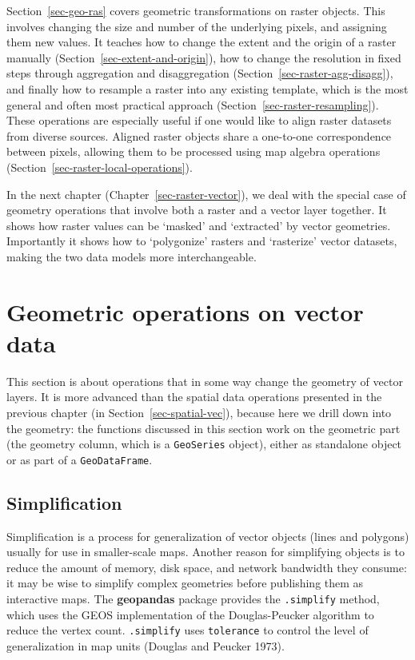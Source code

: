 \documentclass[
  letterpaper,
]{krantz}
\begin{document}
Section~\ref{sec-geo-ras} covers geometric transformations on raster
objects. This involves changing the size and number of the underlying
pixels, and assigning them new values. It teaches how to change the
extent and the origin of a raster manually
(Section~\ref{sec-extent-and-origin}), how to change the resolution in
fixed steps through aggregation and disaggregation
(Section~\ref{sec-raster-agg-disagg}), and finally how to resample a
raster into any existing template, which is the most general and often
most practical approach (Section~\ref{sec-raster-resampling}). These
operations are especially useful if one would like to align raster
datasets from diverse sources. Aligned raster objects share a one-to-one
correspondence between pixels, allowing them to be processed using map
algebra operations (Section~\ref{sec-raster-local-operations}).

In the next chapter (Chapter~\ref{sec-raster-vector}), we deal with the
special case of geometry operations that involve both a raster and a
vector layer together. It shows how raster values can be `masked' and
`extracted' by vector geometries. Importantly it shows how to
`polygonize' rasters and `rasterize' vector datasets, making the two
data models more interchangeable.

\section{Geometric operations on vector data}\label{sec-geo-vec}

This section is about operations that in some way change the geometry of
vector layers. It is more advanced than the spatial data operations
presented in the previous chapter (in Section~\ref{sec-spatial-vec}),
because here we drill down into the geometry: the functions discussed in
this section work on the geometric part (the geometry column, which is a
\texttt{GeoSeries} object), either as standalone object or as part of a
\texttt{GeoDataFrame}.

\subsection{Simplification}\label{sec-simplification}

Simplification is a process for generalization of vector objects (lines
and polygons) usually for use in smaller-scale maps. Another reason for
simplifying objects is to reduce the amount of memory, disk space, and
network bandwidth they consume: it may be wise to simplify complex
geometries before publishing them as interactive maps. The
\textbf{geopandas} package provides the \texttt{.simplify} method, which
uses the GEOS implementation of the Douglas-Peucker algorithm to reduce
the vertex count. \texttt{.simplify} uses \texttt{tolerance} to control
the level of generalization in map units (Douglas and Peucker 1973).
\end{document}
